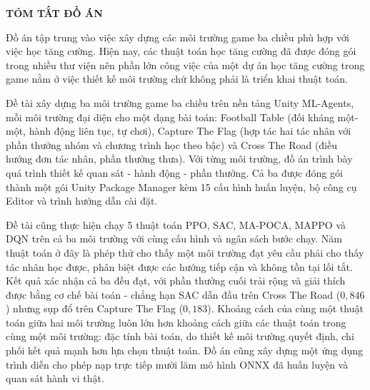 \begin{center}
    {\large\bfseries TÓM TẮT ĐỒ ÁN}
\end{center}

\vspace{0.5cm}

\indent Đồ án tập trung vào việc xây dựng các môi trường game ba chiều phù hợp với việc học tăng cường. Hiện nay, các thuật toán học tăng cường đã được đóng gói trong nhiều thư viện nên phần lớn công việc của một dự án học tăng cường trong game nằm ở việc thiết kế môi trường chứ không phải là triển khai thuật toán.

\indent Đề tài xây dựng ba môi trường game ba chiều trên nền tảng Unity ML-Agents, mỗi
môi trường đại diện cho một dạng bài toán: Football Table (đối kháng một-một, hành động
liên tục, tự chơi), Capture The Flag (hợp tác hai tác nhân với phần thưởng nhóm và
chương trình học theo bậc) và Cross The Road (điều hướng đơn tác nhân, phần thưởng
thưa). Với từng môi trường, đồ án trình bày quá trình thiết kế quan sát - hành
động - phần thưởng. Cả ba được đóng gói thành một gói Unity
Package Manager kèm 15 cấu hình huấn luyện, bộ công cụ Editor và trình hướng dẫn
cài đặt.

\indent Đề tài cũng thực hiện chạy 5 thuật toán PPO, SAC, MA-POCA,
MAPPO và DQN trên cả ba môi trường với cùng cấu hình và ngân sách bước chạy. Năm thuật toán ở đây là phép thử cho thấy một môi trường đạt yêu cầu phải cho thấy tác nhân học được, phân biệt được các
hướng tiếp cận và không tồn tại lối tắt. Kết quả xác nhận cả ba đều đạt, với phần
thưởng cuối trải rộng và giải thích được bằng cơ chế bài toán - chẳng hạn SAC dẫn đầu
trên Cross The Road ($0{,}846$) nhưng sụp đổ trên Capture The Flag ($0{,}183$). Khoảng
cách của cùng một thuật toán giữa hai môi trường luôn lớn hơn khoảng cách giữa các thuật
toán trong cùng một môi trường: đặc tính bài toán, do thiết kế môi trường quyết định,
chi phối kết quả mạnh hơn lựa chọn thuật toán. Đồ án cũng xây dựng một ứng dụng trình
diễn cho phép nạp trực tiếp mười lăm mô hình ONNX đã huấn luyện và quan sát hành vi
thật.

